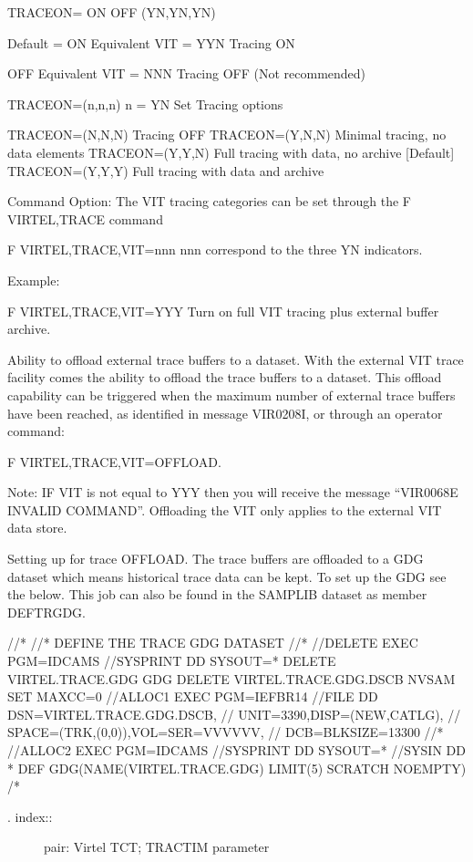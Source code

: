 \documentclass[letterpaper,10pt,english]{sphinxmanual}
\begin{document}
\begin{sphinxVerbatim}[commandchars=\\\{\}]
TRACEON= ON \textbar{} OFF \textbar{} (Y\textbar{}N,Y\textbar{}N,Y\textbar{}N)

Default = ON    Equivalent VIT = YYN    Tracing ON

OFF             Equivalent VIT = NNN    Tracing OFF (Not recommended)

TRACEON=(n,n,n)         n = Y\textbar{}N         Set Tracing options

TRACEON=(N,N,N)                 Tracing OFF
TRACEON=(Y,N,N)                 Minimal tracing, no data elements
TRACEON=(Y,Y,N)                 Full tracing with data, no archive [Default]
TRACEON=(Y,Y,Y)                 Full tracing with data and archive

Command Option:
The VIT tracing categories can be set through the F VIRTEL,TRACE command

F VIRTEL,TRACE,VIT=nnn                  nnn correspond to the three Y\textbar{}N indicators.

Example:

F VIRTEL,TRACE,VIT=YYY                  Turn on full VIT tracing plus external buffer archive.

Ability to offload external trace buffers to a dataset.
With the external VIT trace facility comes the ability to offload the trace buffers to a dataset. This offload capability can be triggered when the maximum number of external trace buffers have been reached, as identified in message VIR0208I, or through an operator command:

F VIRTEL,TRACE,VIT=OFFLOAD.

Note: IF VIT is not equal to YYY then you will receive the message “VIR0068E INVALID COMMAND”. Offloading the VIT only applies to the external VIT data store.

Setting up for trace \PYGZdq{}OFFLOAD\PYGZdq{}.
The trace buffers are offloaded to a GDG dataset which means historical trace data can be kept. To set up the GDG see the below. This job can also be found in the SAMPLIB dataset as member DEFTRGDG.

//*
//* DEFINE THE TRACE GDG DATASET
//*
//DELETE   EXEC PGM=IDCAMS
//SYSPRINT DD SYSOUT=*
 DELETE VIRTEL.TRACE.GDG GDG
 DELETE VIRTEL.TRACE.GDG.DSCB NVSAM
 SET MAXCC=0
//ALLOC1   EXEC PGM=IEFBR14
//FILE     DD DSN=VIRTEL.TRACE.GDG.DSCB,
//            UNIT=3390,DISP=(NEW,CATLG),
//            SPACE=(TRK,(0,0)),VOL=SER=VVVVVV,
//            DCB=BLKSIZE=13300
//*
//ALLOC2   EXEC PGM=IDCAMS
//SYSPRINT  DD SYSOUT=*
//SYSIN     DD *
 DEF GDG(NAME(VIRTEL.TRACE.GDG) LIMIT(5) SCRATCH NOEMPTY)
/*
\end{sphinxVerbatim}
\begin{description}
\item[{. index::}] \leavevmode
pair: Virtel TCT; TRACTIM parameter

\end{description}
\end{document}
